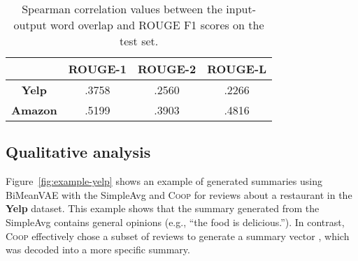 \documentclass[11pt]{article}
\newcommand{\aggname}{\textsc{Coop}}
\newcommand{\scorename}{input-output word overlap}
\newcommand{\name}{\mbox{\sc BiMeanVAE}}
\newcommand{\yelp}{\mbox{\bf Yelp}}
\newcommand{\amazon}{\mbox{\bf Amazon}}
\newcommand{\hl}[1]{#1}
\begin{document}
\begin{table}[t]
    \centering
    \small
    \begin{tabular}{c|ccc}
    \toprule
      & ROUGE-1 & ROUGE-2 & ROUGE-L \\\midrule
      \yelp & .3758 & .2560 & .2266 \\
      \amazon & .5199 & .3903 & .4816 \\ \bottomrule
    \end{tabular}
    \caption{\hl{Spearman correlation values between the \scorename{} and ROUGE F1 scores on the test set.}}\label{tab:correlation}
\end{table}

\subsection{Qualitative analysis} \label{sec:exp:examples}
Figure~\ref{fig:example-yelp} shows an example of generated summaries using \name{} with the SimpleAvg and \aggname{} for reviews about a restaurant in the \yelp{} dataset.
This example shows that the summary generated from the SimpleAvg  contains general opinions (e.g., ``the food is delicious.'').
In contrast, \aggname{} effectively chose a subset of reviews to generate a summary vector , which was decoded into a more specific summary.
\end{document}
